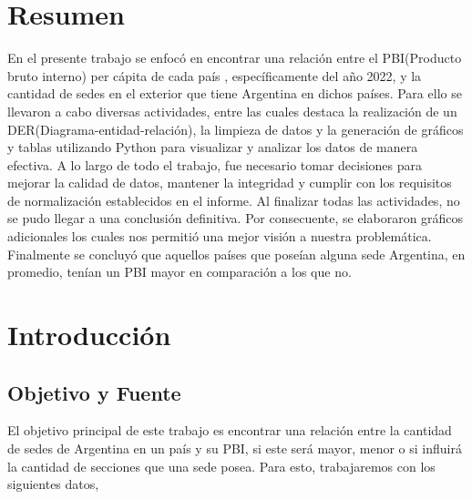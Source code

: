 \documentclass[10pt,a4paper]{article}
\begin{document}

\maketitle

\restoregeometry


\section{Resumen} \vspace{0.3cm}

En el presente trabajo se enfocó en encontrar  una relación entre el PBI(Producto bruto interno) per cápita de cada país , específicamente del año 2022, y la cantidad de sedes en el exterior que tiene Argentina en dichos países.
Para ello se llevaron a cabo diversas actividades, entre las cuales destaca la realización de un  DER(Diagrama-entidad-relación), la limpieza de datos  y  la generación de gráficos y tablas utilizando Python para visualizar y analizar los datos de manera efectiva. A lo largo de todo el  trabajo, fue necesario tomar decisiones para mejorar la calidad de datos, mantener la integridad y cumplir con los requisitos de normalización establecidos en el informe. 
Al finalizar todas las actividades, no se pudo llegar a  una conclusión definitiva. Por consecuente, se elaboraron gráficos adicionales los cuales  nos permitió una mejor visión a nuestra problemática. Finalmente  se  concluyó que  aquellos países que poseían alguna sede Argentina, en promedio, tenían  un PBI mayor en comparación a los que no. 


\section{Introducción} \vspace{0.1cm}

\subsection{Objetivo y Fuente} \vspace{0.3cm}

El objetivo principal de este trabajo es encontrar una relación entre la cantidad de sedes de Argentina en un país y su PBI, si este será mayor, menor o si influirá la cantidad de secciones que una sede posea.  Para esto, trabajaremos con los siguientes datos, 
\end{document}
